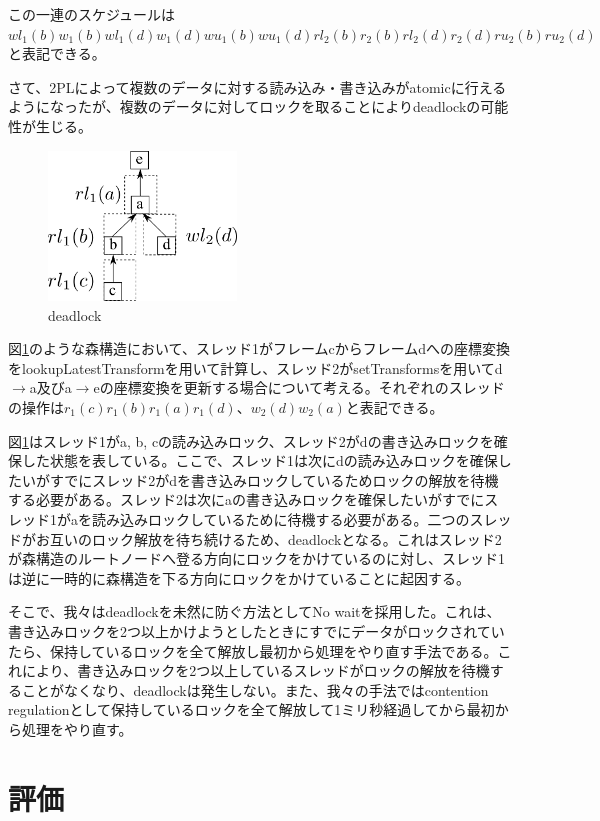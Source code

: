 \documentclass[a4paper]{jreport}	%
\begin{document}
この一連のスケジュールは$wl_1(b)w_1(b)wl_1(d)w_1(d)wu_1(b)wu_1(d)rl_2(b)r_2(b)rl_2(d)r_2(d)ru_2(b)ru_2(d)$と表記できる。

さて、2PLによって複数のデータに対する読み込み・書き込みがatomicに行えるようになったが、複数のデータに対してロックを取ることによりdeadlockの可能性が生じる。


\begin{figure}[h] 
\centering
\includegraphics[width=5cm]{deadlock}
\caption{deadlock}
\label{fig:deadlock}
\end{figure}

図\ref{fig:deadlock}のような森構造において、スレッド1がフレームcからフレームdへの座標変換をlookupLatestTransformを用いて計算し、スレッド2がsetTransformsを用いてd$\rightarrow$a及びa$\rightarrow$eの座標変換を更新する場合について考える。それぞれのスレッドの操作は$r_1(c)r_1(b)r_1(a)r_1(d)$、$w_2(d)w_2(a)$と表記できる。

図\ref{fig:deadlock}はスレッド1がa, b, cの読み込みロック、スレッド2がdの書き込みロックを確保した状態を表している。ここで、スレッド1は次にdの読み込みロックを確保したいがすでにスレッド2がdを書き込みロックしているためロックの解放を待機する必要がある。スレッド2は次にaの書き込みロックを確保したいがすでにスレッド1がaを読み込みロックしているために待機する必要がある。二つのスレッドがお互いのロック解放を待ち続けるため、deadlockとなる。これはスレッド2が森構造のルートノードへ登る方向にロックをかけているのに対し、スレッド1は逆に一時的に森構造を下る方向にロックをかけていることに起因する。

そこで、我々はdeadlockを未然に防ぐ方法としてNo wait\cite{2PL}を採用した。これは、書き込みロックを2つ以上かけようとしたときにすでにデータがロックされていたら、保持しているロックを全て解放し最初から処理をやり直す手法である。これにより、書き込みロックを2つ以上しているスレッドがロックの解放を待機することがなくなり、deadlockは発生しない。また、我々の手法ではcontention regulationとして保持しているロックを全て解放して1ミリ秒経過してから最初から処理をやり直す。

\chapter{評価}
\end{document}
